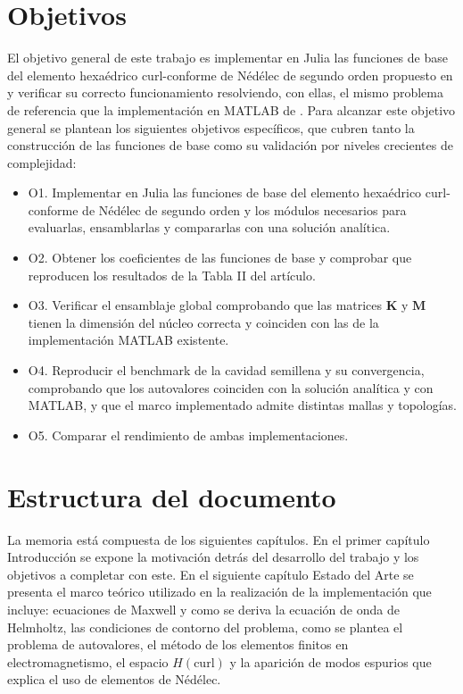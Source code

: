 \documentclass[12pt]{report} %
\begin{document}
\section{Objetivos}\label{sec:objetivos}
El objetivo general de este trabajo es implementar en Julia las funciones de
base del elemento hexaédrico curl-conforme de N\'ed\'elec de segundo orden
propuesto en \cite{amor2023hexahedral} y verificar su correcto funcionamiento
resolviendo, con ellas, el mismo problema de referencia que la implementación
en MATLAB de \cite{amor2022zenodo}. Para alcanzar este objetivo general se
plantean los siguientes objetivos específicos, que cubren tanto la
construcción de las funciones de base como su validación por niveles
crecientes de complejidad:
\begin{itemize}
	\item O1. Implementar en Julia las funciones de base del elemento hexaédrico curl-conforme de Nédélec de segundo orden y los módulos necesarios para evaluarlas, ensamblarlas y compararlas con una solución analítica.
	\item O2. Obtener los coeficientes de las funciones de base y comprobar que reproducen los resultados de la Tabla II del artículo.
	\item O3. Verificar el ensamblaje global comprobando que las matrices $\mathbf{K}$ y $\mathbf{M}$ tienen la dimensión del núcleo correcta y coinciden con las de la implementación MATLAB existente.
	\item O4. Reproducir el benchmark de la cavidad semillena y su convergencia, comprobando que los autovalores coinciden con la solución analítica y con MATLAB, y que el marco implementado admite distintas mallas y topologías.
	\item O5. Comparar el rendimiento de ambas implementaciones.
\end{itemize}

\section{Estructura del documento}\label{sec:estructura}
La memoria está compuesta de los siguientes capítulos. En el primer capítulo Introducción se expone la motivación detrás del desarrollo del trabajo y los objetivos a completar con este. En el siguiente capítulo Estado del Arte se presenta el marco teórico utilizado en la realización de la implementación que incluye: ecuaciones de Maxwell y como se deriva la ecuación de onda de Helmholtz, las condiciones de contorno del problema, como se plantea el problema de autovalores, el método de los elementos finitos en electromagnetismo, el espacio $H(\mathrm{curl})$ y la aparición de modos espurios que explica el uso de elementos de Nédélec.
\end{document}
